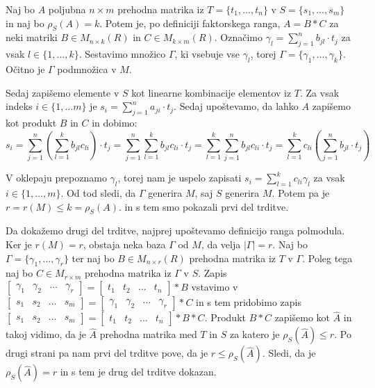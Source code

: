 \documentclass[mat1]{fmfdelo}
\newcommand{\abs}[1]{\ensuremath{\lvert #1 \rvert}}
\begin{document}
\begin{dokaz}
		Naj bo $A$ poljubna $n\times m$ prehodna matrika iz $T = \{t_1, \ldots, t_n\}$ v $S = \{s_1, \ldots, s_m\}$ in naj bo $\rho_S(A) = k$. Potem je, po definiciji faktorskega ranga, $A = B*C$ za neki matriki $B\in M_{n\times k}(R)$ in $C\in M_{k\times m}(R)$. Označimo $\gamma_l =\sum_{j = 1}^{n}b_{jl}\cdot t_j$ za vsak $l\in \{1, \ldots, k\}$. Sestavimo množico $\Gamma$, ki vsebuje vse $\gamma_l$, torej $\Gamma = \{\gamma_1, \ldots, \gamma_k\}$. Očitno je $\Gamma$ podmnožica v $M$.
		
		Sedaj zapišemo elemente v $S$ kot linearne kombinacije elementov iz $T$. Za vsak indeks $i\in\{1, \ldots m\}$ je $s_i = \sum_{j = 1}^{n} a_{ji}\cdot t_j$. Sedaj upoštevamo, da lahko $A$ zapišemo kot produkt $B$ in $C$ in dobimo:  $$s_i = \sum_{j=1}^{n} \left(\sum_{l = 1}^{k}b_{jl}c_{li}\right)\cdot t_j = \sum_{j=1}^{n}\sum_{l = 1}^{k}b_{jl}c_{li}\cdot t_j = \sum_{l=1}^{k}\sum_{j = 1}^{n}b_{jl}c_{li}\cdot t_j = \sum_{l=1}^{k}c_{li}\left(\sum_{j = 1}^{n}b_{jl}\cdot t_j\right)$$
		
		V oklepaju prepoznamo $\gamma_l$, torej nam je uspelo zapisati $s_i = \sum_{l = 1}^{k} c_{li}\gamma_l$ za vsak $i\in \{1, \ldots, m\}$. Od tod sledi, da $\Gamma$ generira $M$, saj $S$ generira $M$. Potem pa je $r = r(M) \leq k = \rho_S(A).$ in s tem smo pokazali prvi del trditve.
		
		Da dokažemo drugi del trditve, najprej upoštevamo definicijo ranga polmodula. Ker je $r(M) = r$, obstaja neka baza $\Gamma$ od $M$, da velja $\abs{\Gamma} = r$. Naj bo $\Gamma = \{\gamma_1, \ldots, \gamma_r\}$ ter naj bo $B \in M_{n\times r}(R)$ prehodna matrika iz $T$ v $\Gamma$. Poleg tega naj bo $C\in M_{r\times m}$ prehodna matrika iz $\Gamma$ v $S$. Zapis $\begin{bmatrix*}
			\gamma_1 & \gamma_2 & \ldots & \gamma_r
		\end{bmatrix*} = \begin{bmatrix*}
		t_1 & t_2 & \ldots & t_n
	\end{bmatrix*}*B$ vstavimo v $\begin{bmatrix*}
		s_1 & s_2 & \ldots & s_m
\end{bmatrix*} = \begin{bmatrix*}
\gamma_1 & \gamma_2 & \ldots & \gamma_r
\end{bmatrix*}*C$ in s tem pridobimo zapis $\begin{bmatrix*}
s_1 & s_2 & \ldots & s_m
\end{bmatrix*} = \begin{bmatrix*}
t_1 & t_2 & \ldots & t_n
\end{bmatrix*}*B*C$. Produkt $B*C$ zapišemo kot $\widehat{A}$ in takoj vidimo, da je $\widehat{A}$ prehodna matrika med $T$ in $S$ za katero je $\rho_S(\widehat{A}) \leq r$. Po drugi strani pa nam prvi del trditve pove, da je $r \leq \rho_S(\widehat{A})$. Sledi, da je $\rho_S(\widehat{A}) = r$ in s tem je drug del trditve dokazan.
\end{dokaz}
\end{document}

